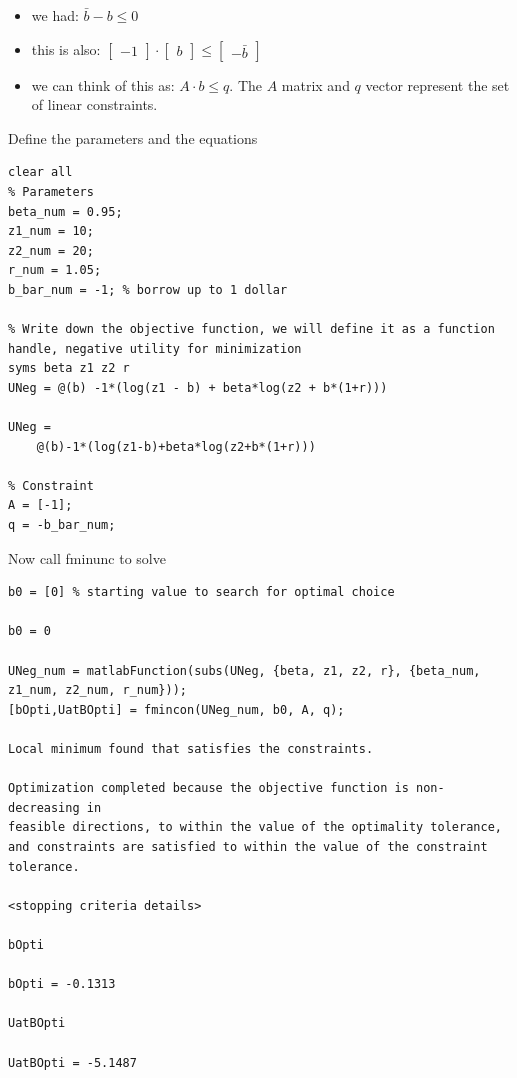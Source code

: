 \documentclass[
]{book}
\begin{document}
\begin{itemize}
\item
  we had: \(\bar{b} -b\le 0\)
\item
  this is also: \(\left\lbrack \begin{array}{c} -1 \end{array}\right\rbrack \cdot \left\lbrack \begin{array}{c} b \end{array}\right\rbrack \le \left\lbrack \begin{array}{c} -\bar{b} \end{array}\right\rbrack\)
\item
  we can think of this as: \(A\cdot b\le q\). The \(A\) matrix and \(q\)
  vector represent the set of linear constraints.
\end{itemize}

Define the parameters and the equations

\begin{verbatim}
clear all
% Parameters
beta_num = 0.95;
z1_num = 10;
z2_num = 20;
r_num = 1.05;
b_bar_num = -1; % borrow up to 1 dollar 

% Write down the objective function, we will define it as a function handle, negative utility for minimization
syms beta z1 z2 r
UNeg = @(b) -1*(log(z1 - b) + beta*log(z2 + b*(1+r)))

UNeg = 
    @(b)-1*(log(z1-b)+beta*log(z2+b*(1+r)))

% Constraint
A = [-1];
q = -b_bar_num;
\end{verbatim}

Now call fminunc to solve

\begin{verbatim}
b0 = [0] % starting value to search for optimal choice

b0 = 0

UNeg_num = matlabFunction(subs(UNeg, {beta, z1, z2, r}, {beta_num, z1_num, z2_num, r_num}));
[bOpti,UatBOpti] = fmincon(UNeg_num, b0, A, q);

Local minimum found that satisfies the constraints.

Optimization completed because the objective function is non-decreasing in 
feasible directions, to within the value of the optimality tolerance,
and constraints are satisfied to within the value of the constraint tolerance.

<stopping criteria details>

bOpti

bOpti = -0.1313

UatBOpti

UatBOpti = -5.1487
\end{verbatim}
\end{document}
